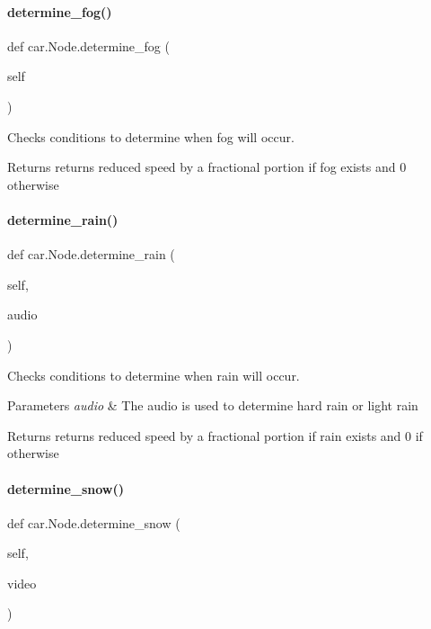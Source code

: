 \paragraph{\texorpdfstring{determine\_fog()}{determine\_fog()}}
{\footnotesize\ttfamily def car.\+Node.\+determine\+\_\+fog (\begin{DoxyParamCaption}\item[{}]{self }\end{DoxyParamCaption})}



Checks conditions to determine when fog will occur. 

\begin{DoxyReturn}{Returns}
returns reduced speed by a fractional portion if fog exists and 0 otherwise 
\end{DoxyReturn}
\mbox{\label{classcar_1_1_node_a0037a6296a1a5c756eca31be64c110a0}} 
\paragraph{\texorpdfstring{determine\_rain()}{determine\_rain()}}
{\footnotesize\ttfamily def car.\+Node.\+determine\+\_\+rain (\begin{DoxyParamCaption}\item[{}]{self,  }\item[{}]{audio }\end{DoxyParamCaption})}



Checks conditions to determine when rain will occur. 


\begin{DoxyParams}{Parameters}
{\em audio} & The audio is used to determine hard rain or light rain \\
\hline
\end{DoxyParams}
\begin{DoxyReturn}{Returns}
returns reduced speed by a fractional portion if rain exists and 0 if otherwise 
\end{DoxyReturn}
\mbox{\label{classcar_1_1_node_ae919d73474fc9699640c236a46e8de97}} 
\paragraph{\texorpdfstring{determine\_snow()}{determine\_snow()}}
{\footnotesize\ttfamily def car.\+Node.\+determine\+\_\+snow (\begin{DoxyParamCaption}\item[{}]{self,  }\item[{}]{video }\end{DoxyParamCaption})}



